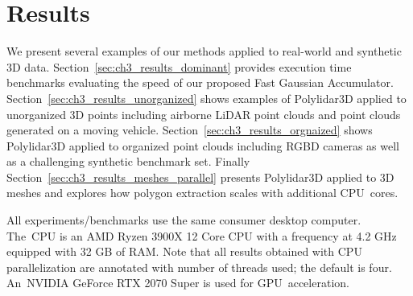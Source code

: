     







\section{Results}\label{sec:ch3_results}

We present several examples of our methods applied to real-world and synthetic 3D data. Section~\ref{sec:ch3_results_dominant} provides execution time benchmarks evaluating the speed of our proposed Fast Gaussian Accumulator. Section~\ref{sec:ch3_results_unorganized} shows examples of Polylidar3D applied to unorganized 3D points including airborne LiDAR point clouds and point clouds generated on a moving vehicle.  Section~\ref{sec:ch3_results_orgnaized} shows Polylidar3D applied to organized point clouds including \ac{RGBD} cameras as well as a challenging synthetic benchmark set. Finally Section~\ref{sec:ch3_results_meshes_parallel} presents Polylidar3D applied to 3D meshes and explores how polygon extraction scales with additional CPU~cores. 

All experiments/benchmarks use the same consumer desktop computer. The~CPU is an AMD Ryzen 3900X 12 Core CPU with a frequency at 4.2 GHz equipped with 32 GB of RAM.  Note that all results obtained with CPU parallelization are annotated with number of threads used; the default is four. An~NVIDIA GeForce RTX 2070 Super is used for GPU~acceleration.


